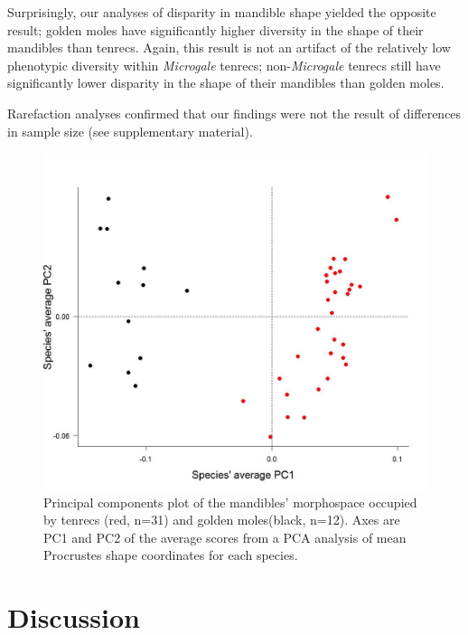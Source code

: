 \documentclass[12pt,a4paper]{article}
\begin{document}
Surprisingly, our analyses of disparity in mandible shape yielded the opposite result; golden moles have significantly higher diversity in the shape of their mandibles than tenrecs.  
Again, this result is not an artifact of the relatively low phenotypic diversity within \textit{Microgale} tenrecs; non-\textit{Microgale} tenrecs still have significantly lower disparity in the shape of their mandibles than golden moles.

Rarefaction analyses confirmed that our findings were not the result of differences in sample size (see supplementary material).


\begin{figure}[H]
\centering
\includegraphics[width=1\linewidth]{figures/Mands_Tenrecs+Gmoles_PC1PC2_01_05_14.jpg}
\caption{Principal components plot of the mandibles' morphospace occupied by tenrecs (red, n=31) and golden moles(black, n=12). Axes are PC1 and PC2 of the average scores from a PCA analysis of mean Procrustes shape coordinates for each species. }
\label{mandsPCA}

\end{figure}



\section{Discussion} %
\end{document}
